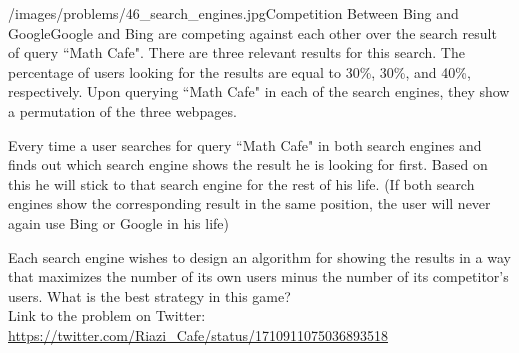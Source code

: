 \begin{problem}{/images/problems/46_search_engines.jpg}{Competition Between Bing and Google}Google and Bing are competing against each other over the search result of query  ``Math Cafe". There are three relevant results for this search. The percentage of users looking for the results are equal to 30\%, 30\%, and 40\%, respectively. Upon querying ``Math Cafe" in each of the search engines, they show a permutation of the three webpages.
	
Every time a user searches for query ``Math Cafe" in both search engines and finds out which search engine shows the result he is looking for first. Based on this he will stick to that search engine for the rest of his life. (If both search engines show the corresponding result in the same position, the user will never again use Bing or Google in his life)
	
Each search engine wishes to design an algorithm for showing the results in a way that maximizes the number of its own users minus the number of its competitor's users. What is the best strategy in this game?\\[0.2cm]
	
Link to the problem on Twitter:  \url{https://twitter.com/Riazi_Cafe/status/1710911075036893518}\end{problem}

